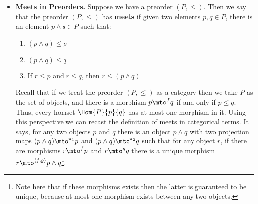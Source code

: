 \begin{itemize}
\item \textbf{Meets in Preorders.} Suppose we have a preorder
  $(P,\leq)$.  Then we say that the preorder $(P,\leq)$ has
  \textbf{meets} if given two elements $p,q \in P$, there is an
  element $p \land q \in P$ such that:
  \begin{enumerate}
  \item $(p \land q) \leq p$
  \item $(p \land q) \leq q$
  \item If $r \leq p$ and $r \leq q$, then $r \leq (p \land q)$
  \end{enumerate}
  Recall that if we treat the preorder $(P,\leq)$ as a category then
  we take $P$ as the set of objects, and there is a morphism $p \mto^f
  q$ if and only if $p \leq q$.  Thus, every homset $\Hom{P}{p}{q}$
  has at most one morphism in it.  Using this perspective we can
  recast the definition of meets in categorical terms.  It says, for
  any two objects $p$ and $q$ there is an object $p \land q$ with two
  projection maps $(p \land q) \mto^{\pi_1} p$ and $(p \land q)
  \mto^{\pi_2} q$ such that for any object $r$, if there are
  morphisms $r \mto^f p$ and $r \mto^g q$ there is a unique morphism
  $r \mto^{\langle f,g \rangle} p \land q$\footnote{Note here that if
    these morphisms exists then the latter is guaranteed to be unique,
    because at most one morphism exists between any two objects.}.


\end{itemize}
